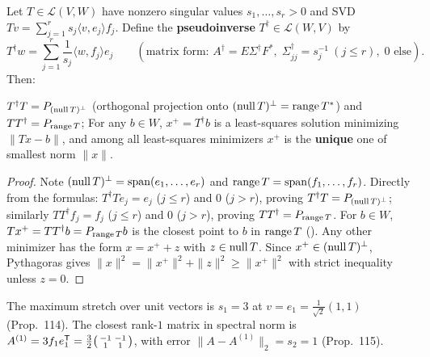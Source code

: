 \documentclass[10pt]{scrartcl}
\newcommand{\LL}{\mathcal L}\newcommand{\PP}{\mathcal P}\newcommand{\MM}{\mathcal M}
\begin{document}
\begin{theorem*}
  Let $T\in\LL(V,W)$ have nonzero singular values $s_1,\dots,s_r>0$ and SVD $Tv=\sum_{j=1}^r s_j\langle v,e_j\rangle f_j$. Define the \textbf{pseudoinverse} $T^\dagger\in\LL(W,V)$ by
  \[
    T^\dagger w = \sum_{j=1}^r \frac{1}{s_j}\langle w,f_j\rangle e_j \qquad (\text{matrix form: } A^\dagger = E\Sigma^\dagger F^*,\; \Sigma^\dagger_{jj}=s_j^{-1}\ (j\le r),\; 0\text{ else}).
  \]
  Then:
  \begin{enumerate}
    \ii[(a)] $T^\dagger T = P_{(\operatorname{null} T)^\perp}$ (orthogonal projection onto $(\operatorname{null} T)^\perp=\operatorname{range} T^*$) and $TT^\dagger = P_{\operatorname{range} T}$;
    \ii[(b)] For any $b\in W$, $x^+ = T^\dagger b$ is a least-squares solution minimizing $\|Tx-b\|$, and among all least-squares minimizers $x^+$ is the \textbf{unique} one of smallest norm $\|x\|$.
  \end{enumerate}
\end{theorem*}
\begin{proof}
  Note $(\operatorname{null} T)^\perp = \operatorname{span}(e_1,\dots,e_r)$ and $\operatorname{range} T = \operatorname{span}(f_1,\dots,f_r)$. Directly from the formulas: $T^\dagger T e_j = e_j$ ($j\le r$) and $0$ ($j>r$), proving $T^\dagger T=P_{(\operatorname{null} T)^\perp}$; similarly $TT^\dagger f_j = f_j$ ($j\le r$) and $0$ ($j>r$), proving $TT^\dagger=P_{\operatorname{range} T}$. For $b\in W$, $Tx^+=TT^\dagger b=P_{\operatorname{range} T}b$ is the closest point to $b$ in $\operatorname{range} T$ (). Any other minimizer has the form $x=x^+ + z$ with $z\in\operatorname{null} T$. Since $x^+\in(\operatorname{null} T)^\perp$, Pythagoras gives $\|x\|^2=\|x^+\|^2+\|z\|^2\ge\|x^+\|^2$ with strict inequality unless $z=0$.
\end{proof}

\revisit The maximum stretch over unit vectors is $s_1=3$ at $v=e_1=\frac{1}{\sqrt{2}}(1,1)$ (Prop.~114). The closest rank-$1$ matrix in spectral norm is $A^{(1)}=3f_1e_1^{\mathsf T}=\frac{3}{2}\begin{psmallmatrix}-1&-1\\1&1\end{psmallmatrix}$, with error $\|A-A^{(1)}\|_2=s_2=1$ (Prop.~115).
\end{document}
